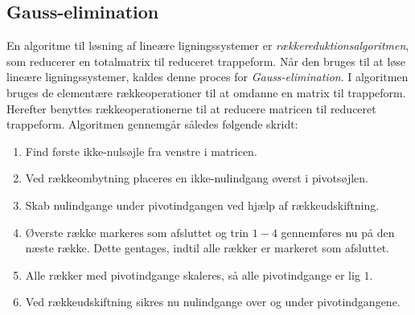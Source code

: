 \subsection{Gauss-elimination}
\label{gauss}
En algoritme til løsning af lineære ligningssystemer er  \textit{rækkereduktionsalgoritmen}, som reducerer en totalmatrix til reduceret trappeform.
Når den bruges til at løse lineære ligningssystemer, kaldes denne proces for \textit{Gauss-elimination}.
I algoritmen bruges de elementære rækkeoperationer til at omdanne en matrix til trappeform. 
Herefter benyttes rækkeoperationerne til at reducere matricen til reduceret trappeform.
Algoritmen gennemgår således følgende skridt:
%
\begin{enumerate}
\item Find første ikke-nulsøjle fra venstre i matricen.
\item Ved rækkeombytning placeres en ikke-nulindgang øverst i pivotsøjlen.
\item Skab nulindgange under pivotindgangen ved hjælp af rækkeudskiftning.
\item Øverste række markeres som afsluttet og trin $1-4$ gennemføres nu på den næste række.
Dette gentages, indtil alle rækker er markeret som afsluttet.
\item Alle rækker med pivotindgange skaleres, så alle pivotindgange er lig $1$.
\item Ved rækkeudskiftning sikres nu nulindgange over og under pivotindgangene.
\end{enumerate}
%
